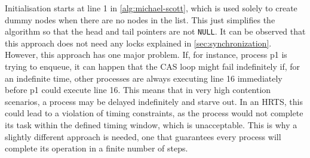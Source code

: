 Initialisation starts at line 1 in \cref{alg:michael-scott}, which is used solely to create dummy nodes when there are no nodes in the list. This just simplifies the algorithm so that the head and tail pointers are not \texttt{NULL}. It can be observed that this approach does not need any locks explained in \cref{sec:synchronization}. However, this approach has one major problem. If, for instance, process p1 is trying to enqueue, it can happen that the \ac{CAS} loop might fail indefinitely if, for an indefinite time, other processes are always executing line 16 immediately before p1 could execute line 16. This means that in very high contention scenarios, a process may be delayed indefinitely and starve out. In an \ac{HRTS}, this could lead to a violation of timing constraints, as the process would not complete its task within the defined timing window, which is unacceptable. This is why a slightly different approach is needed, one that guarantees every process will complete its operation in a finite number of steps. \cite{MichaelScottQueue}


